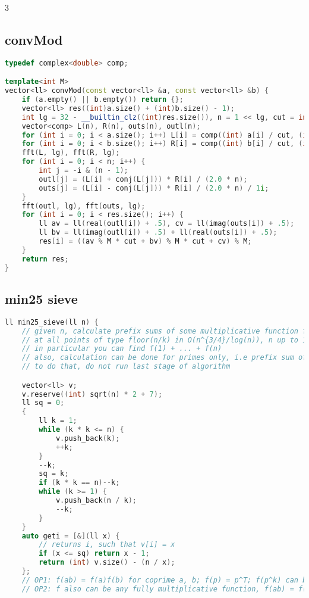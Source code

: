 \documentclass[9pt,a4paper,landscape,twosided]{extarticle}
\begin{document}
\begin{multicols*}{3}
\subsection{convMod}
\begin{lstlisting}[language=C++]
typedef complex<double> comp;

template<int M>
vector<ll> convMod(const vector<ll> &a, const vector<ll> &b) {
    if (a.empty() || b.empty()) return {};
    vector<ll> res((int)a.size() + (int)b.size() - 1);
    int lg = 32 - __builtin_clz((int)res.size()), n = 1 << lg, cut = int(sqrt(M));
    vector<comp> L(n), R(n), outs(n), outl(n);
    for (int i = 0; i < a.size(); i++) L[i] = comp((int) a[i] / cut, (int) a[i] % cut);
    for (int i = 0; i < b.size(); i++) R[i] = comp((int) b[i] / cut, (int) b[i] % cut);
    fft(L, lg), fft(R, lg);
    for (int i = 0; i < n; i++) {
        int j = -i & (n - 1);
        outl[j] = (L[i] + conj(L[j])) * R[i] / (2.0 * n);
        outs[j] = (L[i] - conj(L[j])) * R[i] / (2.0 * n) / 1i;
    }
    fft(outl, lg), fft(outs, lg);
    for (int i = 0; i < res.size(); i++) {
        ll av = ll(real(outl[i]) + .5), cv = ll(imag(outs[i]) + .5);
        ll bv = ll(imag(outl[i]) + .5) + ll(real(outs[i]) + .5);
        res[i] = ((av % M * cut + bv) % M * cut + cv) % M;
    }
    return res;
}
\end{lstlisting}

\subsection{min25 sieve}
\begin{lstlisting}[language=C++]
ll min25_sieve(ll n) {
    // given n, calculate prefix sums of some multiplicative function f
    // at all points of type floor(n/k) in O(n^{3/4}/log(n)), n up to 1e11 is ok
    // in particular you can find f(1) + ... + f(n)
    // also, calculation can be done for primes only, i.e prefix sum of f(i)*I{i is prime}
    // to do that, do not run last stage of algorithm

    vector<ll> v;
    v.reserve((int) sqrt(n) * 2 + 7);
    ll sq = 0;
    {
        ll k = 1;
        while (k * k <= n) {
            v.push_back(k);
            ++k;
        }
        --k;
        sq = k;
        if (k * k == n)--k;
        while (k >= 1) {
            v.push_back(n / k);
            --k;
        }
    }
    auto geti = [&](ll x) {
        // returns i, such that v[i] = x
        if (x <= sq) return x - 1;
        return (int) v.size() - (n / x);
    };
    // OP1: f(ab) = f(a)f(b) for coprime a, b; f(p) = p^T; f(p^k) can be calculated in O(1); we denote f(p^k) = g(p, k) (p is prime) for all k
    // OP2: f also can be any fully multiplicative function, f(ab) = f(a)f(b) for all a,b; you need to calc pref sum of f fast, so only prime case is useful


\end{lstlisting}
\end{multicols*}
\end{document}
